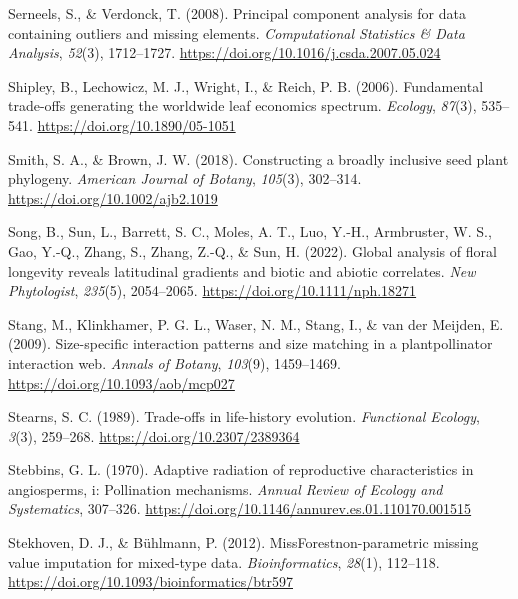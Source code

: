 \documentclass[
  12pt,
  a4paper,
]{article}
\newlength{\cslhangindent}
\newlength{\cslentryspacingunit} %
\newenvironment{CSLReferences}[2] %
 {%
  \setlength{\parindent}{0pt}
  \ifodd #1
  \let\oldpar\par
  \def\par{\hangindent=\cslhangindent\oldpar}
  \fi
  \setlength{\parskip}{#2\cslentryspacingunit}
 }%
 {}
\begin{document}
\begin{CSLReferences}{1}{0}
\leavevmode{}%
Serneels, S., \& Verdonck, T. (2008). Principal component analysis for data containing outliers and missing elements. \emph{Computational Statistics \& Data Analysis}, \emph{52}(3), 1712--1727. \url{https://doi.org/10.1016/j.csda.2007.05.024}

\leavevmode{}%
Shipley, B., Lechowicz, M. J., Wright, I., \& Reich, P. B. (2006). Fundamental trade-offs generating the worldwide leaf economics spectrum. \emph{Ecology}, \emph{87}(3), 535--541. \url{https://doi.org/10.1890/05-1051}

\leavevmode{}%
Smith, S. A., \& Brown, J. W. (2018). Constructing a broadly inclusive seed plant phylogeny. \emph{American Journal of Botany}, \emph{105}(3), 302--314. \url{https://doi.org/10.1002/ajb2.1019}

\leavevmode{}%
Song, B., Sun, L., Barrett, S. C., Moles, A. T., Luo, Y.-H., Armbruster, W. S., Gao, Y.-Q., Zhang, S., Zhang, Z.-Q., \& Sun, H. (2022). Global analysis of floral longevity reveals latitudinal gradients and biotic and abiotic correlates. \emph{New Phytologist}, \emph{235}(5), 2054--2065. \url{https://doi.org/10.1111/nph.18271}

\leavevmode{}%
Stang, M., Klinkhamer, P. G. L., Waser, N. M., Stang, I., \& van der Meijden, E. (2009). Size-specific interaction patterns and size matching in a plant\textendash pollinator interaction web. \emph{Annals of Botany}, \emph{103}(9), 1459--1469. \url{https://doi.org/10.1093/aob/mcp027}

\leavevmode{}%
Stearns, S. C. (1989). Trade-offs in life-history evolution. \emph{Functional Ecology}, \emph{3}(3), 259--268. \url{https://doi.org/10.2307/2389364}

\leavevmode{}%
Stebbins, G. L. (1970). Adaptive radiation of reproductive characteristics in angiosperms, i: Pollination mechanisms. \emph{Annual Review of Ecology and Systematics}, 307--326. \url{https://doi.org/10.1146/annurev.es.01.110170.001515}

\leavevmode{}%
Stekhoven, D. J., \& Bühlmann, P. (2012). {MissForest}\textemdash non-parametric missing value imputation for mixed-type data. \emph{Bioinformatics}, \emph{28}(1), 112--118. \url{https://doi.org/10.1093/bioinformatics/btr597}


\end{CSLReferences}
\end{document}
